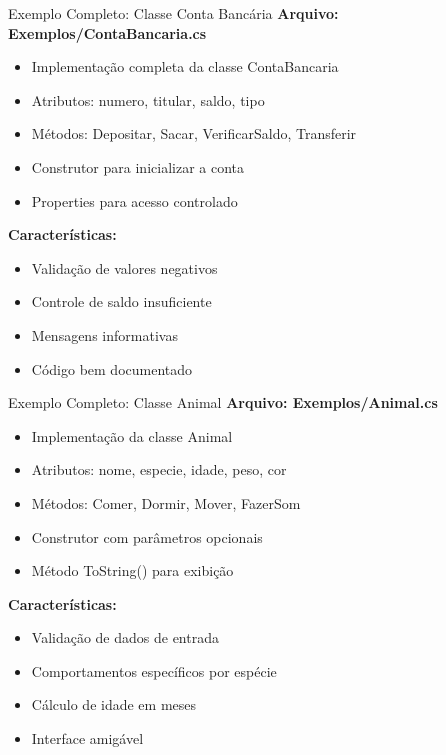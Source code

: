 \documentclass[aspectratio=169]{beamer}
\begin{document}
\begin{frame}{Exemplo Completo: Classe Conta Bancária}
\textbf{Arquivo: Exemplos/ContaBancaria.cs}
\begin{itemize}
\item Implementação completa da classe ContaBancaria
\item Atributos: numero, titular, saldo, tipo
\item Métodos: Depositar, Sacar, VerificarSaldo, Transferir
\item Construtor para inicializar a conta
\item Properties para acesso controlado
\end{itemize}

\vspace{0.3cm}
\textbf{Características:}
\begin{itemize}
\item Validação de valores negativos
\item Controle de saldo insuficiente
\item Mensagens informativas
\item Código bem documentado
\end{itemize}
\end{frame}

\begin{frame}{Exemplo Completo: Classe Animal}
\textbf{Arquivo: Exemplos/Animal.cs}
\begin{itemize}
\item Implementação da classe Animal
\item Atributos: nome, especie, idade, peso, cor
\item Métodos: Comer, Dormir, Mover, FazerSom
\item Construtor com parâmetros opcionais
\item Método ToString() para exibição
\end{itemize}

\vspace{0.3cm}
\textbf{Características:}
\begin{itemize}
\item Validação de dados de entrada
\item Comportamentos específicos por espécie
\item Cálculo de idade em meses
\item Interface amigável
\end{itemize}
\end{frame}
\end{document}
